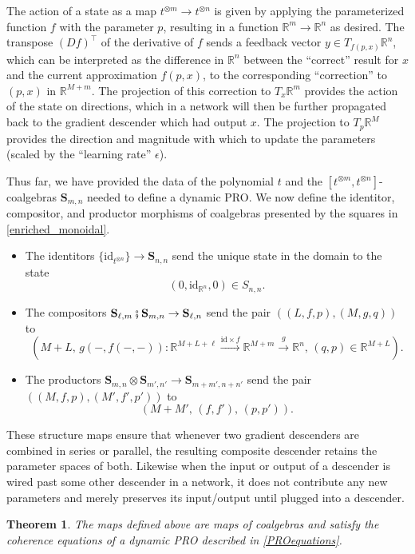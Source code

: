 \documentclass[11pt, one side, article]{memoir}
\theoremstyle{definition}
\theoremstyle{plain}
\newtheorem{theorem}[definitionx]{Theorem}
\newcommand{\Cat}[1]{\mathbf{#1}}%
\newcommand{\id}{\mathrm{id}}
\newcommand{\then}{\mathbin{\fatsemi}}
\newcommand{\To}[2][]{\xrightarrow[#1]{#2}}
\newcommand{\rr}{\mathbb{R}}
\newcommand{\0}{\textsf{0}}
\newcommand{\1}{\tn{\textsf{1}}}
\renewcommand{\S}{{\Cat{S}}}
\newcommand{\idcoalg}[1]{{\{\id_{#1}\}}}
\begin{document}
The action of a state as a map $t^{\otimes m} \to t^{\otimes n}$ is given by applying the parameterized function $f$ with the parameter $p$, resulting in a function $\rr^m \to \rr^n$ as desired. The transpose $(Df)^\top$ of the derivative of $f$ sends a feedback vector $y \in T_{f(p,x)} \rr^n$, which can be interpreted as the difference in $\rr^n$ between the ``correct'' result for $x$ and the current approximation $f(p,x)$, to the corresponding ``correction'' to $(p,x)$ in $\rr^{M+m}$. The projection of this correction to $T_x \rr^m$ provides the action of the state on directions, which in a network will then be further propagated back to the gradient descender which had output $x$. The projection to $T_p \rr^M$ provides the direction and magnitude with which to update the parameters (scaled by the ``learning rate'' $\epsilon$).

Thus far, we have provided the data of the polynomial $t$ and the $[t^{\otimes m},t^{\otimes n}]$-coalgebras $\S_{m,n}$ needed to define a dynamic PRO. We now define the identitor, compositor, and productor morphisms of coalgebras presented by the squares in \cref{enriched_monoidal}.
\begin{itemize}
	\item The identitors $\idcoalg{t^{\otimes n}} \to \S_{n,n}$ send the unique state in the domain to the state 
\[(0,\id_{\rr^n},0) \in S_{n,n}.\] 
	\item The compositors $\S_{\ell,m}\then\S_{m,n} \to \S_{\ell,n}$ send the pair $((L,f,p),(M,g,q))$ to 
\[\left( M+L,\,g(-,f(-,-))\colon \rr^{M+L+\ell} \To{\id \times f} \rr^{M+m} \To{g} \rr^n,\, (q,p) \in \rr^{M+L} \right).\]
	\item The productors $\S_{m,n} \otimes \S_{m',n'} \to \S_{m+m',n+n'}$ send the pair $((M,f,p),(M',f',p'))$ to 
\[(M+M',\,(f,f'),\,(p,p')).\]
\end{itemize}

These structure maps ensure that whenever two gradient descenders are combined in series or parallel, the resulting composite descender retains the parameter spaces of both. Likewise when the input or output of a descender is wired past some other descender in a network, it does not contribute any new parameters and merely preserves its input/output until plugged into a descender.

\begin{theorem}\label{gradientadaptive}
The maps defined above are maps of coalgebras and satisfy the coherence equations of a dynamic PRO described in \cref{PROequations}.%
\end{theorem}
\end{document}
